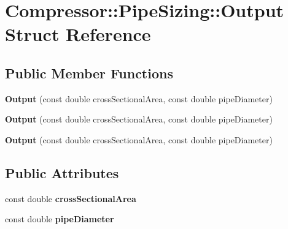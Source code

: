 \hypertarget{struct_compressor_1_1_pipe_sizing_1_1_output}{}\section{Compressor\+:\+:Pipe\+Sizing\+:\+:Output Struct Reference}
\label{struct_compressor_1_1_pipe_sizing_1_1_output}
\subsection*{Public Member Functions}
\begin{DoxyCompactItemize}
\item 
\mbox{\label{struct_compressor_1_1_pipe_sizing_1_1_output_a30c100e28cf3648c7d0295e6e534dfad}} 
{\bfseries Output} (const double cross\+Sectional\+Area, const double pipe\+Diameter)
\item 
\mbox{\label{struct_compressor_1_1_pipe_sizing_1_1_output_a30c100e28cf3648c7d0295e6e534dfad}} 
{\bfseries Output} (const double cross\+Sectional\+Area, const double pipe\+Diameter)
\item 
\mbox{\label{struct_compressor_1_1_pipe_sizing_1_1_output_a30c100e28cf3648c7d0295e6e534dfad}} 
{\bfseries Output} (const double cross\+Sectional\+Area, const double pipe\+Diameter)
\end{DoxyCompactItemize}
\subsection*{Public Attributes}
\begin{DoxyCompactItemize}
\item 
\mbox{\label{struct_compressor_1_1_pipe_sizing_1_1_output_ad609e5f5deba43dfb986ece30d93aa27}} 
const double {\bfseries cross\+Sectional\+Area}
\item 
\mbox{\label{struct_compressor_1_1_pipe_sizing_1_1_output_ab3a3dcae4259383d06f563a39e617559}} 
const double {\bfseries pipe\+Diameter}
\end{DoxyCompactItemize}


